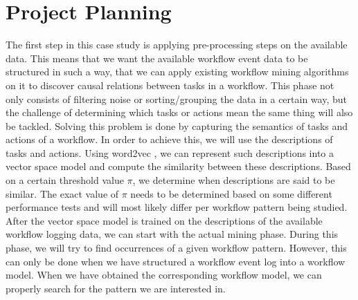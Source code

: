 \documentclass[a4paper,11pt]{article}
\begin{document}
\section{Project Planning}
The first step in this case study is applying pre-processing steps on the available data. This means that we want the available workflow event data to be structured in such a way, that we can apply existing workflow mining algorithms on it to discover causal relations between tasks in a workflow. This phase not only consists of filtering noise or sorting/grouping the data in a certain way, but the challenge of determining which tasks or actions mean the same thing will also be tackled. Solving this problem is done by capturing the semantics of tasks and actions of a workflow. In order to achieve this, we will use the descriptions of tasks and actions. Using word2vec \cite{Mikolov2013a,Mikolov2013b}, we can represent such descriptions into a vector space model and compute the similarity between these descriptions. Based on a certain threshold value $\pi$, we determine when descriptions are said to be similar. The exact value of $\pi$ needs to be determined based on some different performance tests and will most likely differ per workflow pattern being studied.
\\
After the vector space model is trained on the descriptions of the available workflow logging data, we can start with the actual mining phase. During this phase, we will try to find occurrences of a given workflow pattern. However, this can only be done when we have structured a workflow event log into a workflow model. When we have obtained the corresponding workflow model, we can properly search for the pattern we are interested in. 



\end{document}
